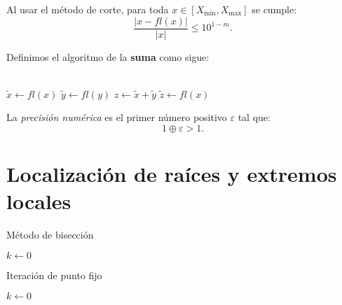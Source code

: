\documentclass[8pt,a4paper]{extarticle}
\begin{document}
\begin{multicols}{3}
\begin{boxtheo}[]
	Al usar el método de corte, para toda $x \in \left[ X_{\min}, X_{\max} \right]$ se cumple:
	\[
		\frac{\left| x - fl(x) \right| }{ \left| x \right|  } \le 10^{1 - m}
	.\] 
\end{boxtheo}

\begin{boxdef}
	Definimos el algoritmo de la \textbf{suma} como sigue:
	\\
	\\
	\begin{algorithm}[H]
		$\tilde{x} \longleftarrow fl(x)$\;
		$\tilde{y} \longleftarrow fl(y)$\;
		$z \longleftarrow \tilde{x} + \tilde{y}$\;
		$\tilde{z} \longleftarrow fl(x)$
	\end{algorithm}
\end{boxdef}

\sectionbreak

\begin{boxdef}
	La \emph{precisión numérica} es el primer número positivo $\varepsilon$ tal que:
	\[
	1 \oplus \varepsilon > 1
	.\] 
\end{boxdef}

\newpage

\section{Localización de raíces y extremos locales}

\begin{algorithm}[H]
	\caption{Método de bisección}
	$k \longleftarrow 0$\;
\end{algorithm}

\vspace{1cm}

\begin{algorithm}[H]
	\caption{Iteración de punto fijo}
	$k \longleftarrow 0$\;
\end{algorithm}


\end{multicols}
\end{document}
